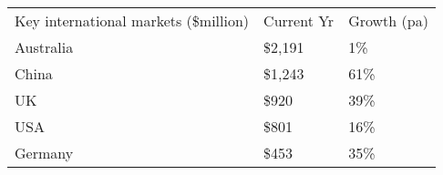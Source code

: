 \begin{tabular}[t]{p{5.1cm}>{\hfill}p{1.1cm}>{\hfill}p{1.3cm}}
 Key international markets (\$million) & Current Yr & Growth (pa) \\ 
 Australia & \$2,191 & 1\% \\ 
  China & \$1,243 & 61\% \\ 
  UK & \$920   & 39\% \\ 
  USA & \$801   & 16\% \\ 
  Germany & \$453   & 35\% \\ 
  \end{tabular}
